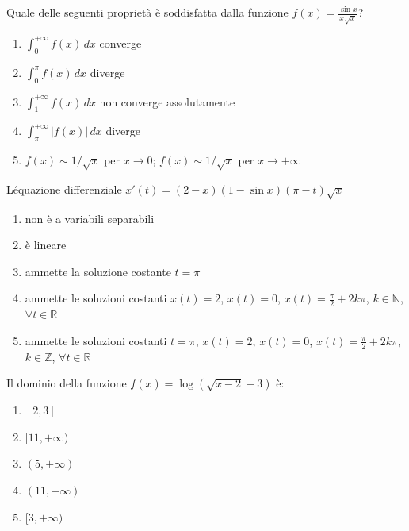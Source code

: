 \begin{quiz}
Quale delle seguenti propriet\`a \`e soddisfatta dalla funzione $f(x)=\frac{\sin x}{x\sqrt x}$?
\begin{enumerate}
\item $\int_0^{+\infty}f(x)\,dx$ converge
\item $\int_0^\pi f(x)\,dx$ diverge
\item $\int_1^{+\infty}f(x)\,dx$ non converge assolutamente
\item $\int_\pi^{+\infty}|f(x)|\,dx$ diverge
\item $f(x)\sim1/\sqrt x$ per $x\to0$; $f(x)\sim1/\sqrt x$ per $x\to+\infty$
\end{enumerate}
\end{quiz}

\begin{quiz}
L\'equazione differenziale $x\prime(t)=(2-x)(1-\sin x)(\pi-t)\sqrt x$
\begin{enumerate}
\item non \`e a variabili separabili
\item \`e lineare
\item ammette la soluzione costante $t=\pi$
\item ammette le soluzioni costanti $x(t)=2$, $x(t)=0$, $x(t)=\frac\pi2+2k\pi$, $k\in\mathbb N$, $\forall t\in\mathbb R$
\item ammette le soluzioni costanti $t=\pi$, $x(t)=2$, $x(t)=0$, $x(t)=\frac\pi2+2k\pi$, $k\in\mathbb Z$, $\forall t\in\mathbb R$
\end{enumerate}
\end{quiz}

\begin{quiz}
Il dominio della funzione $f(x)=\log(\sqrt{x-2}-3)$ \`e:
\begin{enumerate}
\item $[2,3]$
\item $[11,+\infty)$
\item $(5,+\infty)$
\item $(11,+\infty)$
\item $[3,+\infty)$
\end{enumerate}
\end{quiz}

